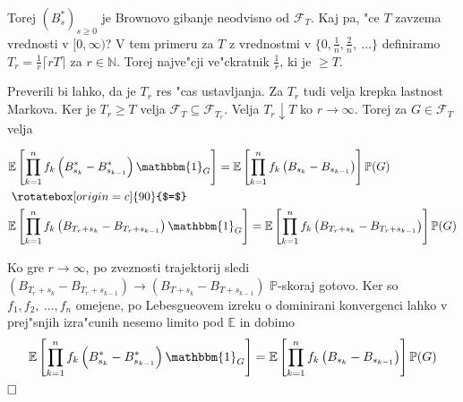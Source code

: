 \documentclass[twoside,11pt]{article}
\begin{document}
\begin{dokaz}
\begin{enumerate}
    \end{enumerate}
    Torej $(B^*_s)_{s\geq0}$ je Brownovo gibanje neodvisno od $\mathcal{F}_T$.
    \noindent
    Kaj pa, "ce $T$ zavzema vrednosti v $[0, \infty)$? V tem primeru za $T$ z vrednostmi v $\{0, \tfrac{1}{n}, \tfrac{2}{n}, \ \ldots \}$
    definiramo $T_r = \tfrac{1}{r}\lceil rT\rceil$ za $r\in\mathbb{N}$. Torej najve"cji ve"ckratnik $\tfrac{1}{r}$, ki je $ \geq T$.

    \begin{figure}[h]
        \centering
    \end{figure}
    
   
    \noindent
     Preverili bi lahko, da je $T_r$ res "cas ustavljanja. Za $T_r$ tudi velja krepka lastnost Markova. Ker je $T_r \geq T$ velja $\mathcal{F}_{T} \subseteq \mathcal{F}_{T_r}$. Velja $T_r \downarrow T$ ko $r \rightarrow \infty$. Torej za $G \in \mathcal{F}_T$ velja

     \begin{align*}
        &\mathbb{E}\left[\prod_{k=1}^nf_k\left(B^*_{s_k} - B^*_{s_{k-1}}\right)\mathbbm{1}_G\right] = \mathbb{E}\left[\prod_{k=1}^nf_k\left(B_{s_k} - B_{s_{k-1}}\right)\right]\mathbb{P}(G) \\
        &\mathrel{\rotatebox[origin=c]{90}{$=$}} \\
        &\mathbb{E}\left[\prod_{k=1}^nf_k\left(B_{T_r +s_k} - B_{T_r + s_{k-1}}\right)\mathbbm{1}_G\right] = \mathbb{E}\left[\prod_{k=1}^nf_k\left(B_{T_r + s_k} - B_{T_r + s_{k-1}}\right)\right]\mathbb{P}(G)
    \end{align*}

    \noindent
    Ko gre $r \rightarrow \infty$, po zveznosti trajektorij sledi $(B_{T_r + s_k} - B_{T_r + s_{k-1}}) \rightarrow (B_{T + s_k} - B_{T + s_{k-1}})$ $\mathbb{P}$-skoraj gotovo. Ker so $f_1, f_2, \ \dots, f_n$ omejene, po  Lebesgueovem izreku o dominirani konvergenci lahko v prej"snjih izra"cunih nesemo limito pod $\mathbb{E}$ in dobimo
    $$
        \mathbb{E}\left[\prod_{k=1}^nf_k\left(B^*_{s_k} - B^*_{s_{k-1}}\right)\mathbbm{1}_G\right] = \mathbb{E}\left[\prod_{k=1}^nf_k\left(B_{s_k} - B_{s_{k-1}}\right)\right]\mathbb{P}(G)
    $$
     $\hfill \square$
\end{dokaz}
\end{document}
